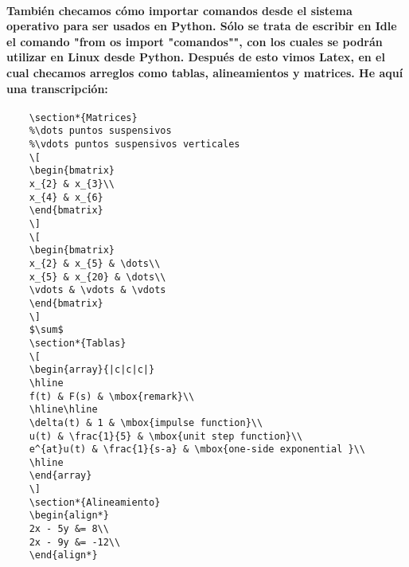 \documentclass[letterpaper, 12pt, oneside]{article} %
\begin{document}
	\paragraph{También checamos cómo importar comandos desde el sistema operativo para ser usados en Python. Sólo se trata de escribir en Idle el comando "from os import "comandos"", con los cuales se podrán utilizar en Linux desde Python. Después de esto vimos Latex, en el cual checamos arreglos como tablas, alineamientos y matrices. He aquí una transcripción:}
	\begin{verbatim}
	\section*{Matrices}
	%\dots puntos suspensivos
	%\vdots puntos suspensivos verticales
	\[
	\begin{bmatrix}
	x_{2} & x_{3}\\
	x_{4} & x_{6}
	\end{bmatrix}
	\]
	\[
	\begin{bmatrix}
	x_{2} & x_{5} & \dots\\
	x_{5} & x_{20} & \dots\\
	\vdots & \vdots & \vdots
	\end{bmatrix}
	\]
	$\sum$
	\section*{Tablas}
	\[
	\begin{array}{|c|c|c|}
	\hline
	f(t) & F(s) & \mbox{remark}\\
	\hline\hline
	\delta(t) & 1 & \mbox{impulse function}\\
	u(t) & \frac{1}{5} & \mbox{unit step function}\\
	e^{at}u(t) & \frac{1}{s-a} & \mbox{one-side exponential }\\
	\hline
	\end{array}
	\]
	\section*{Alineamiento}
	\begin{align*}
	2x - 5y &= 8\\
	2x - 9y &= -12\\
	\end{align*}
	\end{verbatim}
\end{document}

